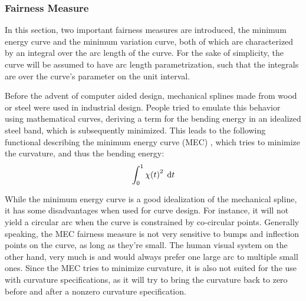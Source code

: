 \documentclass[a4paper]{article}
\begin{document}
			\subsubsection{Fairness Measure}
			\label{section:fairness_measure}

				In this section, two important fairness measures are introduced, the minimum energy curve and the minimum variation curve, both of which are characterized by an integral over the arc length of the curve. For the sake of simplicity, the curve will be assumed to have arc length parametrization, such that the integrals are over the curve's parameter on the unit interval.

				Before the advent of computer aided design, mechanical splines made from wood or steel were used in industrial design. People tried to emulate this behavior using mathematical curves, deriving a term for the bending energy in an idealized steel band, which is subsequently minimized. This leads to the following functional describing the minimum energy curve (MEC) \cite{paper-mec}, which tries to minimize the curvature, and thus the bending energy:
				\begin{equation*}
					\int_{0}^{1} \chi\!\left( t \right)^2 \; \mathrm{d}t
				\end{equation*}

				While the minimum energy curve is a good idealization of the mechanical spline, it has some disadvantages when used for curve design. For instance, it will not yield a circular arc when the curve is constrained by co-circular points. Generally speaking, the MEC fairness measure is not very sensitive to bumps and inflection points on the curve, as long as they're small. The human visual system on the other hand, very much is and would always prefer one large arc to multiple small ones. Since the MEC tries to minimize curvature, it is also not suited for the use with curvature specifications, as it will try to bring the curvature back to zero before and after a nonzero curvature specification.
\end{document}
